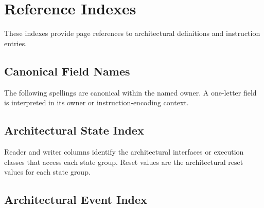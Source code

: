 \clearpage
\appendix
\section{Reference Indexes}\label{page:reference-indexes}\label{section:reference-indexes}

These indexes provide page references to architectural definitions and
instruction entries.

\subsection{Canonical Field Names}

The following spellings are canonical within the named owner. A one-letter field is interpreted in its owner or
instruction-encoding context.



\subsection{Architectural State Index}

Reader and writer columns identify the architectural interfaces or execution classes that access each state group.
Reset values are the architectural reset values for each state group.



\Needspace{2.2in}
\subsection{Architectural Event Index}



